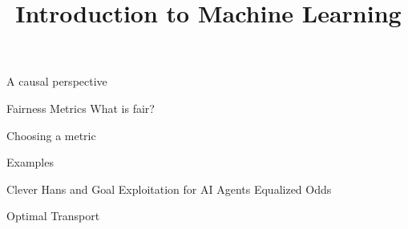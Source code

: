 


\newcommand{\learninggoals}{
\item XXXX
}


\title{Introduction to Machine Learning}
\date{}



\begin{vbframe}{A causal perspective}


\end{vbframe}

\begin{vbframe}{Fairness Metrics}
What is fair?

\framebreak
Choosing a metric

\framebreak
Examples

\end{vbframe}
\begin{vbframe}{Clever Hans and Goal Exploitation for AI Agents}
Equalized Odds

\framebreak
Optimal Transport

\end{vbframe}


\endlecture


